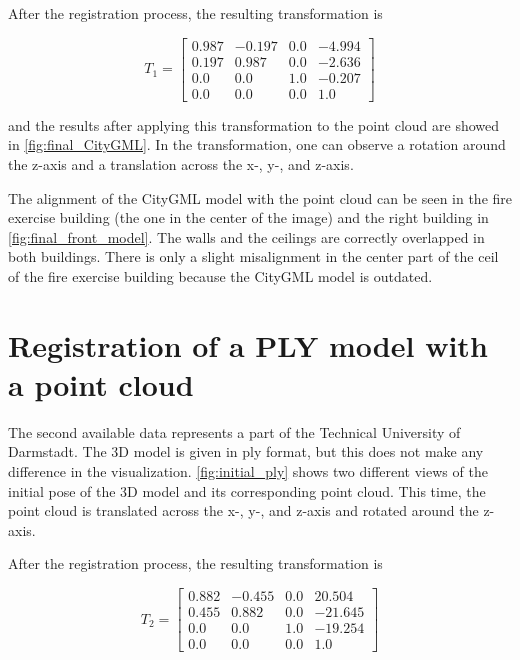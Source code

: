         After the registration process, the resulting transformation is

        \begin{equation*}
            T_1 = 
            \begin{bmatrix}0.987 & -0.197 & 0.0 & -4.994 \\ 
                0.197 & 0.987 & 0.0 & -2.636 \\
                0.0 & 0.0 & 1.0 & -0.207 \\
                0.0 & 0.0 & 0.0 & 1.0
            \end{bmatrix}
        \end{equation*}

        and the results after applying this transformation to the point cloud are showed in \autoref{fig:final_CityGML}.
        In the transformation, one can observe a rotation around the z-axis and a translation across the x-, y-, and z-axis.

        The alignment of the CityGML model with the point cloud can be seen in the fire exercise building (the one in the center of the image)
        and the right building in \autoref{fig:final_front_model}. The walls and the ceilings are correctly overlapped in both buildings.
        There is only a slight misalignment in the center part of the ceil of the fire exercise building because the CityGML model is outdated.

        

    \section{Registration of a PLY model with a point cloud}

        The second available data represents a part of the Technical University of Darmstadt.
        The 3D model is given in ply format, but this does not make any difference in the visualization.
        \autoref{fig:initial_ply} shows two different views of the initial pose of the 3D model and its corresponding point cloud.
        This time, the point cloud is translated across the x-, y-, and z-axis and rotated around the z-axis. 
        
        After the registration process, the resulting transformation is

        \begin{equation*}
            T_2 = 
            \begin{bmatrix}
                0.882 & -0.455 & 0.0 & 20.504 \\ 
                0.455 & 0.882 & 0.0 & -21.645 \\
                0.0 & 0.0 & 1.0 & -19.254 \\
                0.0 & 0.0 & 0.0 & 1.0
            \end{bmatrix}    
        \end{equation*}
        
